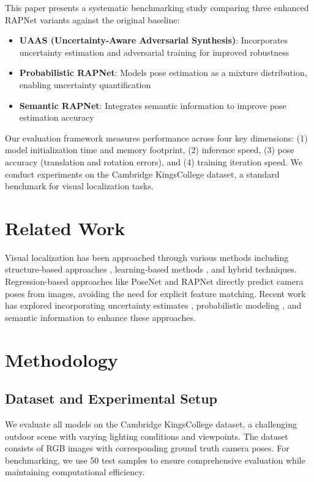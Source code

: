\documentclass[conference]{IEEEtran}
\begin{document}
This paper presents a systematic benchmarking study comparing three enhanced RAPNet variants against the original baseline:
\begin{itemize}
    \item \textbf{UAAS (Uncertainty-Aware Adversarial Synthesis)}: Incorporates uncertainty estimation and adversarial training for improved robustness
    \item \textbf{Probabilistic RAPNet}: Models pose estimation as a mixture distribution, enabling uncertainty quantification
    \item \textbf{Semantic RAPNet}: Integrates semantic information to improve pose estimation accuracy
\end{itemize}

Our evaluation framework measures performance across four key dimensions: (1) model initialization time and memory footprint, (2) inference speed, (3) pose accuracy (translation and rotation errors), and (4) training iteration speed. We conduct experiments on the Cambridge KingsCollege dataset, a standard benchmark for visual localization tasks.

\section{Related Work}

Visual localization has been approached through various methods including structure-based approaches \cite{sattler2012}, learning-based methods \cite{mapnet}, and hybrid techniques. Regression-based approaches like PoseNet \cite{posenet} and RAPNet directly predict camera poses from images, avoiding the need for explicit feature matching. Recent work has explored incorporating uncertainty estimates \cite{uncertainty}, probabilistic modeling \cite{probabilistic}, and semantic information \cite{semantic} to enhance these approaches.

\section{Methodology}

\subsection{Dataset and Experimental Setup}

We evaluate all models on the Cambridge KingsCollege dataset, a challenging outdoor scene with varying lighting conditions and viewpoints. The dataset consists of RGB images with corresponding ground truth camera poses. For benchmarking, we use 50 test samples to ensure comprehensive evaluation while maintaining computational efficiency.
\end{document}
